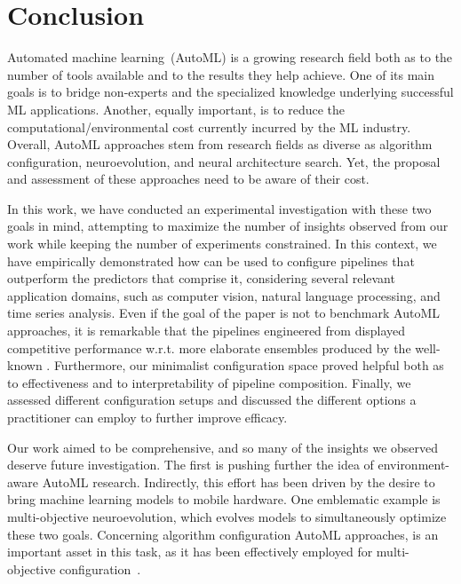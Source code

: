 
\section{Conclusion}
\label{sec:conclusion}

Automated machine learning~(AutoML) is a growing research field both as to the number of tools available and to the results they help achieve. One of its main goals is to bridge non-experts and the specialized knowledge underlying successful ML applications. Another, equally important, is to reduce the computational/environmental cost currently incurred by the ML industry. Overall, AutoML approaches stem from research fields as diverse as algorithm configuration, neuroevolution, and neural architecture search. Yet, the proposal and assessment of these approaches need to be aware of their cost.

In this work, we have conducted an experimental investigation with these two goals in mind, attempting to maximize the number of insights observed from our work while keeping the number of experiments constrained. In this context, we have empirically demonstrated how \irace can be used to configure pipelines that outperform the predictors that comprise it, considering several relevant application domains, such as computer vision, natural language processing, and time series analysis. Even if the goal of the paper is not to benchmark AutoML approaches, it is remarkable that the pipelines engineered from \isklearn displayed competitive performance w.r.t. more elaborate ensembles produced by the well-known \autosklearn. 
Furthermore, our minimalist configuration space proved helpful both as to effectiveness and to interpretability of pipeline composition. Finally, we assessed different configuration setups and discussed the different options a practitioner can employ to further improve efficacy. 

Our work aimed to be comprehensive, and so many of the insights we observed deserve future investigation. The first is pushing further the idea of environment-aware AutoML research. Indirectly, this effort has been driven by the desire to bring machine learning models to mobile hardware. One emblematic example is multi-objective neuroevolution, which evolves models to simultaneously optimize these two goals. Concerning algorithm configuration AutoML approaches, \irace is an important asset in this task, as it 
has been effectively employed for multi-objective configuration~\cite{BezerraPhD,BezLopStu2020}. 

